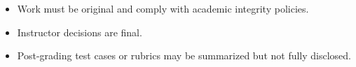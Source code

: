 \begin{itemize}
  \item Work must be original and comply with academic integrity policies.
  \item Instructor decisions are final.
  \item Post-grading test cases or rubrics may be summarized but not fully disclosed.
\end{itemize}
